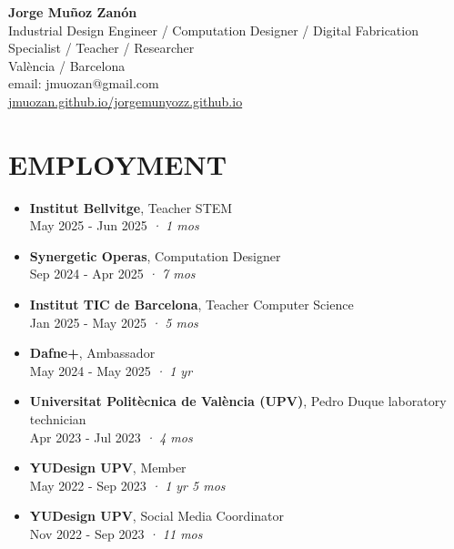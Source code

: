 \documentclass[11pt,a4paper]{article}
\begin{document}
\begin{center}
\textbf{\Large Jorge Muñoz Zanón}\\
\vspace{0.1cm}
Industrial Design Engineer / Computation Designer / Digital Fabrication Specialist / Teacher / Researcher\\
València / Barcelona\\
email: jmuozan@gmail.com\\
\href{https://jmuozan.github.io/jorgemunyozz.github.io/}{jmuozan.github.io/jorgemunyozz.github.io}
\end{center}

\section*{EMPLOYMENT}
\begin{itemize}[leftmargin=*,label={},itemsep=6pt]
    \item \textbf{Institut Bellvitge}, Teacher STEM\\
    May 2025 - Jun 2025 \textit{· 1 mos}

    \item \textbf{Synergetic Operas}, Computation Designer\\
    Sep 2024 - Apr 2025 \textit{· 7 mos}
    
    \item \textbf{Institut TIC de Barcelona}, Teacher Computer Science\\
    Jan 2025 - May 2025 \textit{· 5 mos}
    
    \item \textbf{Dafne+}, Ambassador\\
    May 2024 - May 2025 \textit{· 1 yr}
    
    \item \textbf{Universitat Politècnica de València (UPV)}, Pedro Duque laboratory technician\\
    Apr 2023 - Jul 2023 \textit{· 4 mos}
    
    \item \textbf{YUDesign UPV}, Member\\
    May 2022 - Sep 2023 \textit{· 1 yr 5 mos}
    
    \item \textbf{YUDesign UPV}, Social Media Coordinator\\
    Nov 2022 - Sep 2023 \textit{· 11 mos}
\end{itemize}
\end{document}
